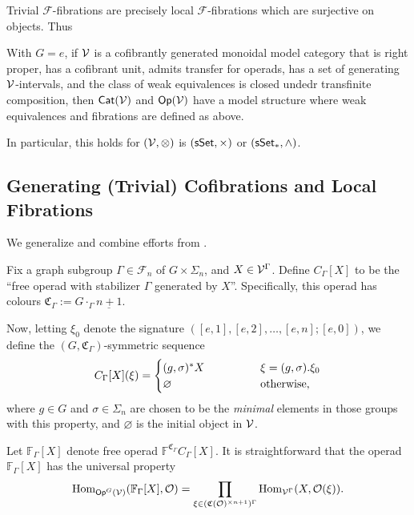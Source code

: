 \documentclass[a4paper,10pt
,draft
]{article}%
\renewcommand{\F}{\mathcal F}
\renewcommand{\1}{\ensuremath{\mathbb{id}}}
\begin{document}
\begin{remark}
      Trivial $\F$-fibrations are precisely local $\F$-fibrations which are surjective on objects.
      Thus
\end{remark}

\begin{theorem}
      With $G = e$, if $\mathcal V$ is a
      cofibrantly generated monoidal model category
      that is right proper,
      has a cofibrant unit,
      admits transfer for operads,
      has a set of generating $\mathcal V$-intervals, and
      the class of weak equivalences is closed undedr transfinite composition,
      then
      $\mathsf{Cat}(\mathcal V)$ and $\mathsf{Op}(\mathcal V)$ have a model structure where weak equivalences and fibrations are defined as above.

      In particular, this holds for $(\mathcal V, \otimes)$ is $(\mathsf{sSet}, \times)$ or $(\sSet_{\**}, \wedge)$. 
\end{theorem}


\subsection{Generating (Trivial) Cofibrations and Local Fibrations}

We generalize and combine efforts from \cite{CM13b, BM13, Cav14}.

Fix a graph subgroup $\Gamma \in \F_n$ of $G \times \Sigma_n$, and $X \in \mathcal V^\Gamma$.
Define $C_\Gamma[X]$ to be the ``free operad with stabilizer $\Gamma$ generated by $X$''.
Specifically, this operad has colours $\mathfrak C_\Gamma := G \cdot_\Gamma \underline{n+1}$.

Now, letting $\xi_0$ denote the signature $([e,1],[e,2],\dots,[e,n];[e,0])$,
we define the $(G,\mathfrak C_\Gamma)$-symmetric sequence
\begin{equation}
      C_\Gamma[X](\xi) =
      \begin{cases}
            (g,\sigma)^{\**} X \qquad \qquad & \xi = (g,\sigma).\xi_0
            \\
            \varnothing & \mbox{otherwise,}
      \end{cases}
\end{equation}
where $g \in G$ and $\sigma \in \Sigma_n$ are chosen to be the \textit{minimal} elements in those groups with this property,
and $\varnothing$ is the initial object in $\mathcal V$.

Let $\mathbb F_\Gamma[X]$ denote free operad $\mathbb F^{\mathfrak C_\Gamma} C_\Gamma[X]$.
It is straightforward that the operad $\mathbb F_\Gamma[X]$ has the universal property
\begin{equation}
      \operatorname{Hom}_{\mathsf{Op}^G(\mathcal V)}(\mathbb F_\Gamma[X], \mathcal{O}) = \mathop\prod\limits_{\xi \in (\mathfrak C(\mathcal{O})^{\times n+1})^\Gamma}\operatorname{Hom}_{\mathcal V^\Gamma}(X, \mathcal{O}(\xi)).
\end{equation}
\end{document}
